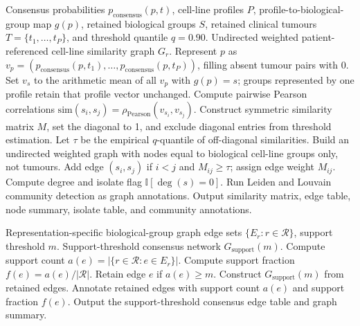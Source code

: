 \begin{algorithm}[H]
\caption{Representation-specific patient-referenced cell-line similarity graph construction}
\label{alg:cell_line_similarity_network}
\small
\begin{algorithmic}[1]
\Require Consensus probabilities \(p_{\mathrm{consensus}}(p,t)\), cell-line profiles \(P\), profile-to-biological-group map \(g(p)\), retained biological groups \(S\), retained clinical tumours \(T=\{t_1,\ldots,t_P\}\), and threshold quantile \(q=0.90\).
\Ensure Undirected weighted patient-referenced cell-line similarity graph \(G_r\).
  \State Represent \(p\) as \(v_p=(p_{\mathrm{consensus}}(p,t_1),\ldots,p_{\mathrm{consensus}}(p,t_P))\), filling absent tumour pairs with 0.
\EndFor
{}
  \State Set \(v_s\) to the arithmetic mean of all \(v_p\) with \(g(p)=s\); groups represented by one profile retain that profile vector unchanged.
\EndFor
\State Compute pairwise Pearson correlations \(\mathrm{sim}(s_i,s_j)=\rho_{\mathrm{Pearson}}(v_{s_i},v_{s_j})\).
\State Construct symmetric similarity matrix \(M\), set the diagonal to 1, and exclude diagonal entries from threshold estimation.
\State Let \(\tau\) be the empirical \(q\)-quantile of off-diagonal similarities.
\State Build an undirected weighted graph with nodes equal to biological cell-line groups only, not tumours.
\State Add edge \((s_i,s_j)\) if \(i<j\) and \(M_{ij}\geq\tau\); assign edge weight \(M_{ij}\).
  \State Compute degree and isolate flag \(\mathbb{I}[\deg(s)=0]\).
\EndFor
\State Run Leiden and Louvain community detection as graph annotations.
\State Output similarity matrix, edge table, node summary, isolate table, and community annotations.
\end{algorithmic}
\end{algorithm}

\begin{algorithm}[H]
\caption{Support-threshold consensus network across representations}
\label{alg:supp_support_threshold_consensus_network}
\small
\begin{algorithmic}[1]
\Require Representation-specific biological-group graph edge sets
\(\{E_r:r\in\mathcal{R}\}\), support threshold \(m\).
\Ensure Support-threshold consensus network \(G_{\mathrm{support}}(m)\).
  \State Compute support count
  \(a(e)=|\{r\in\mathcal{R}:e\in E_r\}|\).
  \State Compute support fraction
  \(f(e)=a(e)/|\mathcal{R}|\).
\EndFor
\State Retain edge \(e\) if \(a(e)\geq m\).
\State Construct \(G_{\mathrm{support}}(m)\) from retained edges.
\State Annotate retained edges with support count \(a(e)\) and support fraction \(f(e)\).
\State Output the support-threshold consensus edge table and graph summary.
\end{algorithmic}
\end{algorithm}

